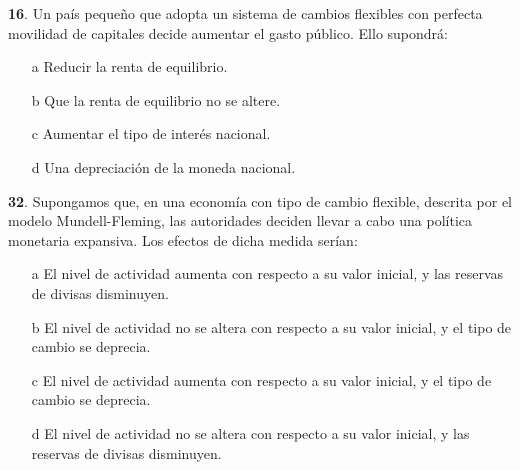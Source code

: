 \documentclass{nuevotema}
\begin{document}

\textbf{16}. Un país pequeño que adopta un sistema de cambios flexibles con perfecta movilidad de capitales decide aumentar el gasto público. Ello supondrá:

\begin{enumerate}
	\item[a] Reducir la renta de equilibrio.
	\item[b] Que la renta de equilibrio no se altere.
	\item[c] Aumentar el tipo de interés nacional.
	\item[d] Una depreciación de la moneda nacional.
\end{enumerate}


\textbf{32}. Supongamos que, en una economía con tipo de cambio flexible, descrita por el modelo Mundell-Fleming, las autoridades deciden llevar a cabo una política monetaria expansiva. Los efectos de dicha medida serían:
\begin{enumerate}
	\item[a] El nivel de actividad aumenta con respecto a su valor inicial, y las reservas de divisas disminuyen.
	\item[b] El nivel de actividad no se altera con respecto a su valor inicial, y el tipo de cambio se deprecia. 
	\item[c] El nivel de actividad aumenta con respecto a su valor inicial, y el tipo de cambio se deprecia.
	\item[d] El nivel de actividad no se altera con respecto a su valor inicial, y las reservas de divisas disminuyen.
\end{enumerate}
\end{document}
